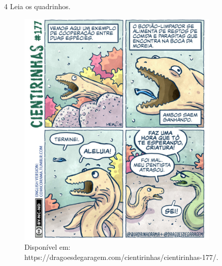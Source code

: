 

\num{4} Leia os quadrinhos.

\begin{figure}[H]
\centering\includegraphics[width=3.78188in,height=4.54167in]{./imgSAEB_6_POR/media/image44.png}
\caption{Disponível em: https://dragoesdegaragem.com/cientirinhas/cientirinhas-177/.}
\end{figure}



